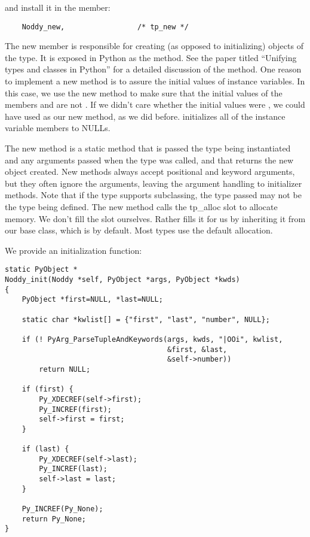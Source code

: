and install it in the  member:

\begin{verbatim}
    Noddy_new,                 /* tp_new */
\end{verbatim}

The new member is responsible for creating (as opposed to
initializing) objects of the type.  It is exposed in Python as the
 method.  See the paper titled ``Unifying types and
classes in Python'' for a detailed discussion of the 
method.  One reason to implement a new method is to assure the initial
values of instance variables.  In this case, we use the new method to
make sure that the initial values of the members  and
 are not \NULL. If we didn't care whether the initial
values were \NULL, we could have used  as
our new method, as we did before.  
initializes all of the instance variable members to NULLs.

The new method is a static method that is passed the type being
instantiated and any arguments passed when the type was called,
and that returns the new object created. New methods always accept
positional and keyword arguments, but they often ignore the arguments,
leaving the argument handling to initializer methods. Note that if the
type supports subclassing, the type passed may not be the type being
defined.  The new method calls the tp_alloc slot to allocate memory.
We don't fill the  slot ourselves. Rather
 fills it for us by inheriting it from our
base class, which is  by default.  Most types use the
default allocation.

We provide an initialization function:

\begin{verbatim}
static PyObject *
Noddy_init(Noddy *self, PyObject *args, PyObject *kwds)
{
    PyObject *first=NULL, *last=NULL;

    static char *kwlist[] = {"first", "last", "number", NULL};

    if (! PyArg_ParseTupleAndKeywords(args, kwds, "|OOi", kwlist, 
                                      &first, &last, 
                                      &self->number))
        return NULL; 

    if (first) {
        Py_XDECREF(self->first);
        Py_INCREF(first);
        self->first = first;
    }

    if (last) {
        Py_XDECREF(self->last);
        Py_INCREF(last);
        self->last = last;
    }

    Py_INCREF(Py_None);
    return Py_None;
}
\end{verbatim}

